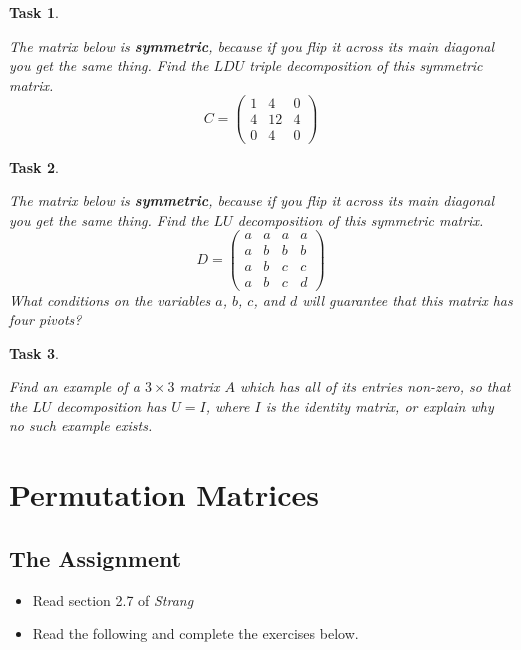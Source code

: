 \documentclass[10pt,]{book}
\newcommand{\terminology}[1]{\textbf{#1}}
\theoremstyle{plain}
\numberwithin{equation}{section}
\newtheorem{task}{Task}[chapter]
\begin{document}
\begin{task}
\label{task-73}

      The matrix below is \terminology{symmetric}, because if you flip it
      across its main diagonal you get the same thing. Find the \(LDU\)
      triple decomposition of this symmetric matrix.
      \[
        C =
        \begin{pmatrix}
        1 & 4 & 0 \\
        4 & 12 & 4 \\
        0 & 4 & 0
        \end{pmatrix}
      \]\end{task}
\begin{task}
\label{task-74}

      The matrix below is \terminology{symmetric}, because if you flip it
      across its main diagonal you get the same thing. Find the \(LU\)
      decomposition of this symmetric matrix.
      \[
        D =
        \begin{pmatrix}
        a & a & a & a \\
        a & b & b & b \\
        a & b & c & c \\
        a & b & c & d
        \end{pmatrix}
      \]
      What conditions on the variables \(a\), \(b\), \(c\),
      and \(d\) will guarantee that this matrix has four pivots?
    \end{task}
\begin{task}
\label{task-75}

      Find an example of a \(3\times 3\) matrix \(A\) which has all of
      its entries non-zero, so that the \(LU\) decomposition has
      \(U = I\), where \(I\) is the identity matrix, or explain why no
      such example exists.
    \end{task}
\clearpage
\typeout{************************************************}
\typeout{************************************************}
\section[Permutation Matrices]{Permutation Matrices}\label{permutations}
\typeout{************************************************}
\typeout{************************************************}
\subsection[The Assignment]{The Assignment}\label{subsection-51}
\begin{itemize}
\item{}Read section 2.7 of \emph{Strang}\item{}Read the following and complete the exercises below.\end{itemize}
\typeout{************************************************}
\typeout{************************************************}
\end{document}

